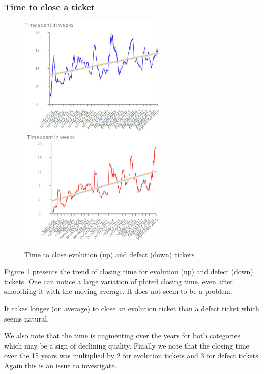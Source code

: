 \documentclass[10pt,conference]{IEEEtran}
\begin{document}
\subsubsection{Time to close a ticket}

\begin{figure}[htbp]
  \centering
  \includegraphics[width=70mm]{./images/openCloseEvol.png} \\
  \includegraphics[width=70mm]{./images/openCloseBug.png}
  \caption{Time to close evolution (up) and defect (down) tickets}
  \label{fig:closingTime}
\end{figure}

Figure \ref{fig:closingTime} presents the trend of closing time for evolution (up) and defect (down) tickets.
One can notice a large variation of ploted closing time, even after smoothing it with the moving average.
It does not seem to be a problem.

It takes longer (on average) to close an evolution ticket than a defect ticket which seems natural.

We also note that the time is augmenting over the years for both categories which may be a sign of declining quality.
Finally we note that the closing time over the 15 years was multiplied by 2 for evolution tickets and 3 for defect tickets.
Again this is an issue to investigate.
\end{document}
